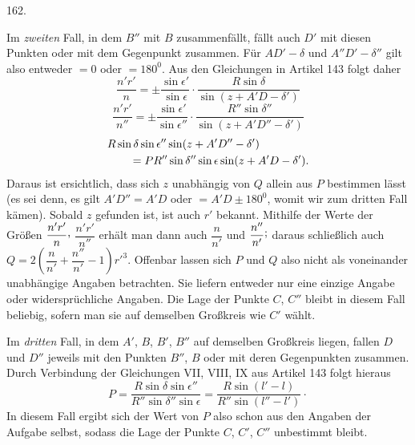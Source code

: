 \par{}\medskip
\begin{center}\hypertarget{native-225-article162}{}162.\end{center}
Im \emph{zweiten} Fall, in dem $B''$ mit $B$ zusammenfällt, fällt auch $D'$ mit diesen Punkten oder mit dem Gegenpunkt zusammen. Für $AD'-\delta$ und $A''D'-\delta''$ gilt also entweder $=0$ oder $=180^0$. Aus den Gleichungen in Artikel 143 folgt daher
\[
\frac{n'r'}{n}=\pm\frac{\sin\epsilon'}{\sin\epsilon}\cdot
\frac{R\sin\delta}{\sin(z+A'D-\delta')}
\]
\[
\frac{n'r'}{n''}=\pm\frac{\sin\epsilon'}{\sin\epsilon''}\cdot
\frac{R''\sin\delta''}{\sin(z+A'D''-\delta')}
\]
\[
\begin{aligned}
&R\sin\delta\sin\epsilon''\sin(z+A'D''-\delta')\notag\\
&\qquad=PR''\sin\delta''\sin\epsilon\sin(z+A'D-\delta').
\end{aligned}
\]
Daraus ist ersichtlich, dass sich $z$ unabhängig von $Q$ allein aus $P$ bestimmen lässt (es sei denn, es gilt $A'D''=A'D$ oder $=A'D\pm180^0$, womit wir zum dritten Fall kämen). Sobald $z$ gefunden ist, ist auch $r'$ bekannt. Mithilfe der Werte der Größen $\dfrac{n'r'}{n}\mathpunct{\raisebox{.45ex}{,}}$
$\dfrac{n'r'}{n''}$ erhält man dann auch $\dfrac{n}{n'}$ und $\dfrac{n''}{n'}\mathpunct{\raisebox{.45ex}{;}}$ daraus schließlich auch $Q=2\left(\dfrac{n}{n'}+\dfrac{n''}{n'}-1\right)r'^3$. Offenbar lassen sich $P$ und $Q$ also nicht als voneinander unabhängige Angaben betrachten. Sie liefern entweder nur eine einzige Angabe oder widersprüchliche Angaben. Die Lage der Punkte $C$, $C''$ bleibt in diesem Fall beliebig, sofern man sie auf demselben Großkreis wie $C'$ wählt.

Im \emph{dritten} Fall, in dem $A'$, $B$, $B'$, $B''$ auf demselben Großkreis liegen, fallen $D$ und $D''$ jeweils mit den Punkten $B''$, $B$ oder mit deren Gegenpunkten zusammen. Durch Verbindung der Gleichungen VII, VIII, IX aus Artikel 143 folgt hieraus
\[
P=\frac{R\sin\delta\sin\epsilon''}{R''\sin\delta''\sin\epsilon}
=\frac{R\sin(l'-l)}{R''\sin(l''-l')}\mathpunct{\cdot}
\]
In diesem Fall ergibt sich der Wert von $P$ also schon aus den Angaben der Aufgabe selbst, sodass die Lage der Punkte $C$, $C'$, $C''$ unbestimmt bleibt.
